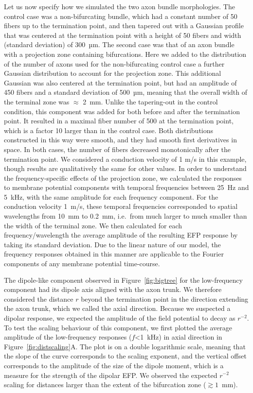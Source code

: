 \documentclass[]{elife}
\begin{document}
Let us now specify how we simulated the two axon bundle morphologies.
The control case was a non-bifurcating bundle, which had a constant
number of 50 fibers up to the termination point, and then tapered out
with a Gaussian profile that was centered at the termination point with
a height of 50 fibers and width (standard deviation) of 300~µm. The
second case was that of an axon bundle with a projection zone containing
bifurcations. Here we added to the distribution of the number of axons
used for the non-bifurcating control case a further Gaussian
distribution to account for the projection zone. This additional
Gaussian was also centered at the termination point, but had an
amplitude of 450 fibers and a standard deviation of 500~µm, meaning that
the overall width of the terminal zone was \(\approx\) 2~mm. Unlike the
tapering-out in the control condition, this component was added for both
before and after the termination point. It resulted in a maximal fiber
number of 500 at the termination point, which is a factor 10 larger than
in the control case. Both distributions constructed in this way were
smooth, and they had smooth first derivatives in space. In both cases,
the number of fibers decreased monotonically after the termination
point. We considered a conduction velocity of 1 m/s in this example,
though results are qualitatively the same for other values. In order to
understand the frequency-specific effects of the projection zone, we
calculated the responses to membrane potential components with temporal
frequencies between 25~Hz and 5~kHz, with the same amplitude for each
frequency component. For the conduction velocity 1~m/s, these temporal
frequencies corresponded to spatial wavelengths from 10~mm to 0.2~mm,
i.e.~from much larger to much smaller than the width of the terminal
zone. We then calculated for each frequency/wavelength the average
amplitude of the resulting EFP response by taking its standard
deviation. Due to the linear nature of our model, the frequency
responses obtained in this manner are applicable to the Fourier
components of any membrane potential time-course.

The dipole-like component observed in Figure~\ref{fig:bigtree} for the
low-frequency component had its dipole axis aligned with the axon trunk.
We therefore considered the distance \(r\) beyond the termination point
in the direction extending the axon trunk, which we called the axial
direction. Because we suspected a dipolar response, we expected the
amplitude of the field potential to decay as \(r^{-2}\). To test the
scaling behaviour of this component, we first plotted the average
amplitude of the low-frequency responses (\(f\)\textless{}1~kHz) in
axial direction in Figure~\ref{fig:distscaling}A. The plot is on a
double logarithmic scale, meaning that the slope of the curve
corresponds to the scaling exponent, and the vertical offset corresponds
to the amplitude of the size of the dipole moment, which is a measure
for the strength of the dipolar EFP. We observed the expected \(r^{-2}\)
scaling for distances larger than the extent of the bifurcation zone
(\(\gtrsim 1\)~mm).
\end{document}
